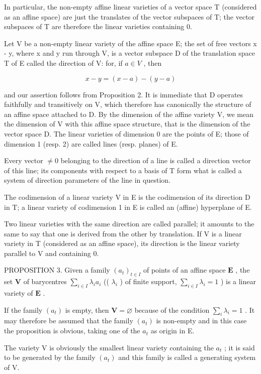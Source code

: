 In particular, the non-empty affine linear varieties of a vector space T (considered as an affine space) are just the translates of the vector subspaces of T; the vector subspaces of T are therefore the linear varieties containing 0.

Let V be a non-empty linear variety of the affine space E; the set of free vectors x - y, where x and y run through V, is a vector subspace D of the translation space T of E called the direction of V: for, if \(a \in V\) , then

\[
x - y = (x - a) - (y - a)
\]

and our assertion follows from Proposition 2. It is immediate that D operates faithfully and transitively on V, which therefore has canonically the structure of an affine space attached to D. By the dimension of the affine variety V, we mean the dimension of V with this affine space structure, that is the dimension of the vector space D. The linear varieties of dimension 0 are the points of E; those of dimension 1 (resp. 2) are called lines (resp. planes) of E.

Every vector \(\neq0\) belonging to the direction of a line is called a direction vector of this line; its components with respect to a basis of T form what is called a system of direction parameters of the line in question.

The codimension of a linear variety V in E is the codimension of its direction D in T; a linear variety of codimension 1 in E is called an (affine) hyperplane of E.

Two linear varieties with the same direction are called parallel; it amounts to the same to say that one is derived from the other by translation. If V is a linear variety in T (considered as an affine space), its direction is the linear variety parallel to V and containing 0.

PROPOSITION 3. Given a family \((a_{t})_{t\in I}\) of points of an affine space \(\mathbf{E}\) , the set \(\mathbf{V}\) of barycentres \(\sum_{i\in I}\lambda_i a_i\) (( \(\lambda_i\) ) of finite support, \(\sum_{i\in I}\lambda_i = 1\) ) is a linear variety of \(\mathbf{E}\) .

If the family \((a_{t})\) is empty, then \(\mathbf{V} = \varnothing\) because of the condition \(\sum_{i}\lambda_{i} = 1\) . It may therefore be assumed that the family \((a_{t})\) is non-empty and in this case the proposition is obvious, taking one of the \(a_{t}\) as origin in E.

The variety V is obviously the smallest linear variety containing the \(a_{t}\) ; it is said to be generated by the family \((a_{t})\) and this family is called a generating system of V.

